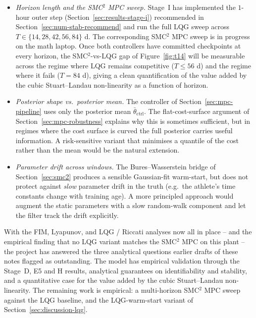 \begin{itemize}
  \item \emph{Horizon length and the SMC${}^2$ MPC sweep.} Stage~I has
        implemented the $1$-hour outer step (Section~\ref{sec:results-stage-i})
        recommended in Section~\ref{sec:num-stab-recommend} and run the
        full LQG sweep across
        $T \in \{14, 28, 42, 56, 84\}$ d. The corresponding SMC${}^2$
        MPC sweep is in progress on the math laptop. Once both controllers
        have committed checkpoints at every horizon, the
        SMC${}^2$-vs-LQG gap of Figure~\ref{fig:t14} will be measurable
        across the regime where LQG remains competitive ($T \le 56$ d)
        and the regime where it fails ($T = 84$ d), giving a clean
        quantification of the value added by the cubic Stuart--Landau
        non-linearity as a function of horizon.
  \item \emph{Posterior shape vs.\ posterior mean.} The controller of
        Section~\ref{sec:mpc-pipeline} uses only the posterior mean
        $\bar\theta_{\mathrm{ctrl}}$. The flat-cost-surface argument of
        Section~\ref{sec:mpc-robustness} explains why this is sometimes
        sufficient, but in regimes where the cost surface is curved the
        full posterior carries useful information. A risk-sensitive
        variant that minimises a quantile of the cost rather than the
        mean would be the natural extension.
  \item \emph{Parameter drift across windows.} The Bures--Wasserstein
        bridge of Section~\ref{sec:smc2} produces a sensible
        Gaussian-fit warm-start, but does not protect against
        \emph{slow} parameter drift in the truth (e.g.\ the athlete's
        time constants change with training age). A more principled
        approach would augment the static parameters with a slow
        random-walk component and let the filter track the drift
        explicitly.
\end{itemize}

\medskip
\noindent
With the FIM, Lyapunov, and LQG / Riccati analyses now all in place
-- and the empirical finding that no LQG variant matches the
SMC${}^2$ MPC on this plant -- the project has answered the three
analytical questions earlier drafts of these notes flagged as
outstanding. The model has empirical validation through the Stage~D,
E5 and H results, analytical guarantees on identifiability and
stability, and a quantitative case for the value added by the cubic
Stuart--Landau non-linearity. The remaining work is empirical: a
multi-horizon SMC${}^2$ MPC sweep against the LQG baseline, and the
LQG-warm-start variant of Section~\ref{sec:discussion-lqg}.
